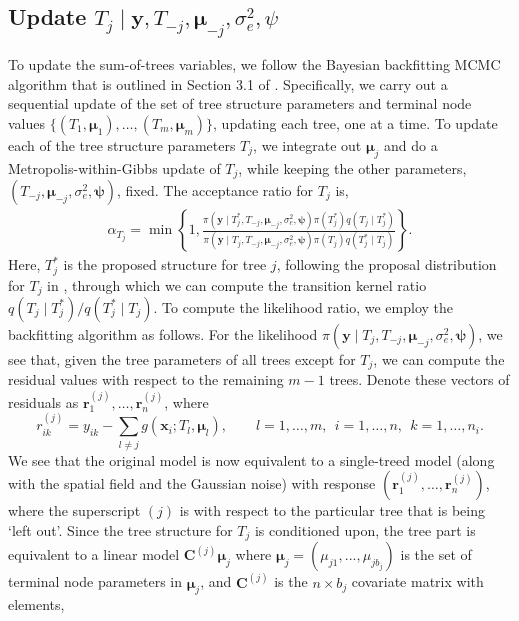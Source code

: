 \documentclass{article}
\begin{document}
\subsection{Update \texorpdfstring{$T_j \mid \boldsymbol{y}, T_{-j}, \boldsymbol{\mu}_{-j}, \sigma_e^2, \psi$}{u1}}
\label{sec:treeupdate}
To update the sum-of-trees variables, we follow the Bayesian backfitting MCMC algorithm that is outlined in Section 3.1 of \cite{chipman1998bayesian}. Specifically, we carry out a sequential update of the set of tree structure parameters and terminal node values $\{(T_1, \boldsymbol{\mu}_1), \dots, (T_m, \boldsymbol{\mu}_m)\}$, updating each tree, one at a time. To update each of the tree structure parameters $T_j$, we  integrate out $\boldsymbol{\mu}_j$ and do a Metropolis-within-Gibbs update of $T_j$, while keeping the other parameters, $(T_{-j}, \boldsymbol{\mu}_{-j}, \sigma_e^2, \boldsymbol{\psi})$, fixed. The acceptance ratio for $T_j$ is,
\begin{align}
\label{eq:T_accept}
	\alpha_{T_j} = \min \left\{1, \frac{\pi\left(\boldsymbol{y} \mid T_{j}^{*}, T_{-j}, \boldsymbol{\mu}_{-j}, \sigma_e^2,\boldsymbol{\psi}\right) \pi\left(T_{j}^{*}\right) q\left(T_{j}\mid T_{j}^{*}\right)}{\pi\left(\boldsymbol{y} \mid T_{j}, T_{-j}, \boldsymbol{\mu}_{-j}, \sigma_e^2, \boldsymbol{\psi}\right) \pi\left(T_{j}\right) q\left(T_{j}^{*} \mid T_{j}\right)}\right\}.
\end{align}
Here, $T_j^*$ is the proposed structure for tree $j$, following the proposal distribution for $T_j$ in \cite{chipman2010bart}, through which we can compute the transition kernel ratio $
q\left(T_j \mid T_j^*\right)
/
 q\left(T_j^* \mid T_j\right)
$. To compute the likelihood ratio, we employ the backfitting algorithm as follows. For the likelihood $\pi\left(\boldsymbol{y} \mid T_{j}, T_{-j}, \boldsymbol{\mu}_{-j}, \sigma_e^2, \boldsymbol{\psi}\right)$, we see that, given the tree parameters of all trees except for $T_j$, we can compute the residual values with respect to the remaining $m-1$ trees. Denote these vectors of residuals as $\boldsymbol{r}^{(j)}_{1}, \dots, \boldsymbol{r}^{(j)}_{n}$, where 
$${r}_{ik}^{(j)} = {y}_{ik}- \sum_{l \neq j} g\left(\boldsymbol{x}_{i} ; T_{l}, \boldsymbol{\mu}_{l}\right), \qquad l = 1,\dots,m, ~~ i = 1, \dots ,n, ~~ k = 1, \dots, n_i.$$
We see that the original model is now equivalent to a single-treed  model (along with the spatial field and the Gaussian noise) with response $(\boldsymbol{r}_1^{(j)}, \dots, \boldsymbol{r}_{n}^{(j)})$, where the superscript $(j)$ is with respect to the particular tree that is being `left out'. Since the tree structure for $T_j$ is conditioned upon, the tree part is equivalent to a linear model ${\mathbf{C}^{(j)}}\boldsymbol{\mu}_j$ where $\boldsymbol{\mu}_j = (\mu_{j1}, ..., \mu_{jb_j})$ is the set of terminal node parameters in $\boldsymbol{\mu}_j$, and ${\mathbf{C}^{(j)}}$ is the $n \times b_j$ covariate matrix with elements,
\end{document}
